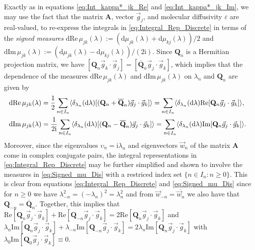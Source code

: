 \documentclass[11pt]{amsart}
\newcommand{\I}{\mathrm{i}}
\renewcommand{\d}{\mathrm{d}}
\newcommand{\Ab}{\mathbf{A}}
\newcommand{\Qb}{\mathbf{Q}}
\begin{document}
Exactly as in equations \eqref{eq:Int_kappa*_jk_Re} and
\eqref{eq:Int_kappa*_jk_Im}, we may use the fact that the matrix
$\Ab$, vector $\vec{g}_j$, and molecular diffusivity $\varepsilon$ are
real-valued, to re-express the integrals in
\eqref{eq:Integral_Rep_Discrete} in terms of the \emph{signed
  measures} 
$\d\text{Re}\,\mu_{jk}(\lambda):=(\d\mu_{jk}(\lambda)+\d\mu_{kj}(\lambda))/2$ and
$\d\text{Im}\,\mu_{jk}(\lambda):=(\d\mu_{jk}(\lambda)-\d\mu_{kj}(\lambda))/(2\I)$. Since
$\Qb_n$ is a Hermitian projection matrix, we have
$[\Qb_n\vec{g}_k\cdot\vec{g}_j]=[\overline{\Qb}_n\vec{g}_j\cdot\vec{g}_k]$,
which implies that the dependence of the measures
$\d\text{Re}\,\mu_{jk}(\lambda)$ and $\d\text{Im}\,\mu_{jk}(\lambda)$ on $\lambda_n$ and
$\Qb_n$ are given by  
%
\begin{align}\label{eq:Signed_mu_Dis}
  &\d\text{Re}\,\mu_{jk}(\lambda)      
      =\frac{1}{2}\sum_{n\in I_n}\langle\delta_{\lambda_n}(\d\lambda)[(\Qb_n+\overline{\Qb}_n)\vec{g}_j\cdot\vec{g}_k]\rangle
      =\sum_{n\in I_n}\langle\delta_{\lambda_n}(\d\lambda)\text{Re}[\Qb_n\vec{g}_j\cdot\vec{g}_k]\rangle,
      \\
  &\d\text{Im}\,\mu_{jk}(\lambda)
      =\frac{1}{2\I}\sum_{n\in I_n}\langle\delta_{\lambda_n}(\d\lambda)[(\Qb_n-\overline{\Qb}_n)\vec{g}_j\cdot\vec{g}_k]\rangle
      =\sum_{n\in I_n}\langle\delta_{\lambda_n}(\d\lambda)\text{Im}[\Qb_n\vec{g}_j\cdot\vec{g}_k]\rangle.
      \notag
\end{align}
%
Moreover, since the eigenvalues $\upsilon_n=\I\lambda_n$ and eigenvectors
$\vec{w}_n$ of the matrix $\Ab$ come in complex conjugate pairs, the
integral representations in \eqref{eq:Integral_Rep_Discrete} may be
further simplified and shown \cite{Pavliotis:PHD_Thesis} to involve
the measures in \eqref{eq:Signed_mu_Dis} with a restriced index set
$\{n\in I_n:n\geq0\}$. This is clear from equations
\eqref{eq:Integral_Rep_Discrete} and \eqref{eq:Signed_mu_Dis} since
for $n\geq0$ we have $\lambda_{-n}^2=(-\lambda_n)^2=\lambda_n^2$ and from
$\vec{w}_{-n}=\overline{\vec{w}_n}$ we also have that
$\Qb_{-n}=\overline{\Qb}_n$. Together, this implies that
$\text{Re}[\Qb_n\vec{g}_j\cdot\vec{g}_k]+\text{Re}[\Qb_{-n}\vec{g}_j\cdot\vec{g}_k] 
=2\text{Re}[\Qb_n\vec{g}_j\cdot\vec{g}_k]$ and
$\lambda_n\text{Im}[\Qb_n\vec{g}_j\cdot\vec{g}_k]+\lambda_{-n}\text{Im}[\Qb_{-n}\vec{g}_j\cdot\vec{g}_k]
=2\lambda_n\text{Im}[\Qb_n\vec{g}_j\cdot\vec{g}_k]$ with
$\lambda_0\text{Im}[\Qb_0\vec{g}_j\cdot\vec{g}_k]\equiv0$.
\end{document}

